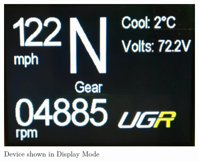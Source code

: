 \begin{figure}[H]
\begin{center}
\includegraphics[width=10cm]{Figures/display.jpg}
\end{center}
\caption{Device shown in Display Mode}
\label{fig:display}
\end{figure}
